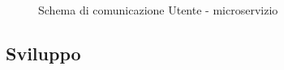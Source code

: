 \begin{figure}[ht]
	\centering
	\caption{Schema di comunicazione Utente - microservizio}
	\label{fig:one}
\end{figure}

\subsection{Sviluppo}\label{sec:sviluppomicroservizio}
